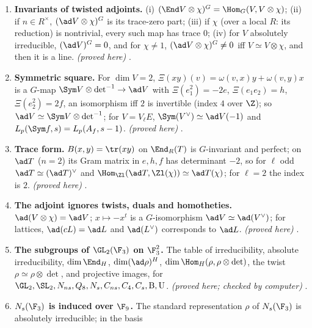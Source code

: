 \begin{enumerate}[label=\textbf{\thechapter.\arabic*}]
$\lambda_1/\lambda_2,1,\lambda_2/\lambda_1$; (iii) in the basis $e,h,f$: $\Ad\mathrm{diag}(x,y)=\mathrm{diag}(x/y,1,y/x)$; for $t=\sm1{n'}01$, $(t-1)e=0$,
$(t-1)h=-2n'e$, $(t-1)f=n'h-n'^2e$; for $F=\sm{\varepsilon q}{c'}0\varepsilon$, $FeF^{-1}=qe$, $FhF^{-1}=h-2c'\varepsilon^{-1}e$,
$FfF^{-1}=q^{-1}f+c'\varepsilon^{-1}q^{-1}h-c'^2\varepsilon^{-2}q^{-1}e$. \emph{(proved here)} .
\item \textbf{Invariants of twisted adjoints.} (i) $(\End V\otimes\chi)^G=\Hom_G(V,V\otimes\chi)$; (ii) if $n\in R^\times$, $(\ad V\otimes\chi)^G$ is its
trace-zero part; (iii) if $\chi$ (over a local $R$: its reduction) is nontrivial, every such map has trace $0$; (iv) for $V$
absolutely irreducible, $(\ad V)^G=0$, and for $\chi\ne1$, $(\ad V\otimes\chi)^G\ne0$ iff $V\simeq V\otimes\chi$, and then it is a line.
\emph{(proved here)} .
\item \textbf{Symmetric square.} For $\dim V=2$, $\Xi(xy)(v)=\omega(v,x)y+\omega(v,y)x$ is a $G$-map $\Sym V\otimes\det^{-1}\to\ad V$ with
$\Xi(e_1^2)=-2e$, $\Xi(e_1e_2)=h$, $\Xi(e_2^2)=2f$, an isomorphism iff $2$ is invertible (index $4$ over $\Z$); so $\ad V\simeq\Sym V\otimes\det^{-1}$;
for $V=V_\ell E$, $\Sym(V^\vee)\simeq\ad V(-1)$ and $L_p(\Sym f,s)=L_p(A_f,s-1)$. \emph{(proved here)} .
\item \textbf{Trace form.} $B(x,y)=\tr(xy)$ on $\End_R(T)$ is $G$-invariant and perfect; on $\ad T$ ($n=2$) its Gram matrix in $e,h,f$ has
determinant $-2$, so for $\ell$ odd $\ad T\simeq(\ad T)^\vee$ and $\Hom_{\Zl}(\ad T,\Zl(\chi))\simeq\ad T(\chi)$; for $\ell=2$ the index is $2$.
\emph{(proved here)} .
\item \textbf{The adjoint ignores twists, duals and homotheties.} $\ad(V\otimes\chi)=\ad V$; $x\mapsto-x^t$ is a $G$-isomorphism
$\ad V\simeq\ad(V^\vee)$; for lattices, $\ad(cL)=\ad L$ and $\ad(L^\vee)$ corresponds to $\ad L$. \emph{(proved here)}
.
\item \textbf{The subgroups of $\GL_2(\F_3)$ on $\F_3^2$.} The table of irreducibility, absolute irreducibility, $\dim\End_H$, $\dim(\ad\rho)^H$,
$\dim\Hom_H(\rho,\rho\otimes\det)$, the twist $\rho\simeq\rho\otimes\det$, and projective images, for $\GL_2,\SL_2,N_{ns},Q_8,N_s,C_{ns},C_4,C_s,\mathrm B,\mathrm U$.
\emph{(proved here; checked by computer)} .
\item \textbf{$N_s(\F_3)$ is induced over $\F_9$.} The standard representation $\rho$ of $N_s(\F_3)$ is absolutely irreducible; in the basis

\end{enumerate}
